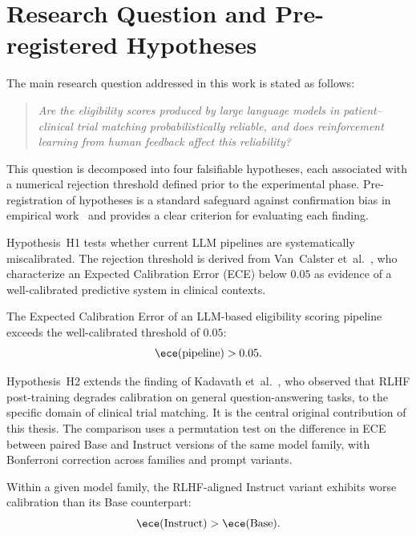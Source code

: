 \section{Research Question and Pre-registered Hypotheses}
\label{sec:met-hypotheses}

The main research question addressed in this work is stated as follows:

\begin{quote}
    \itshape
    Are the eligibility scores produced by large language models in 
    patient--clinical trial matching probabilistically reliable, and does 
    reinforcement learning from human feedback affect this reliability?
\end{quote}

This question is decomposed into four falsifiable hypotheses, each associated 
with a numerical rejection threshold defined prior to the experimental phase. 
Pre-registration of hypotheses is a standard safeguard against confirmation 
bias in empirical work~\cite{collins2024tripod} and provides a clear criterion 
for evaluating each finding.

Hypothesis~H1 tests whether current LLM pipelines are systematically 
miscalibrated. The rejection threshold is derived from Van~Calster 
et~al.~\cite{vancalster2019calibration}, who characterize an Expected 
Calibration Error (ECE) below $0.05$ as evidence of a well-calibrated 
predictive system in clinical contexts.

\begin{hypothesis}
    The Expected Calibration Error of an LLM-based eligibility scoring 
    pipeline exceeds the well-calibrated threshold of $0.05$:
    \[
        \ece(\text{pipeline}) > 0.05.
    \]
\end{hypothesis}

Hypothesis~H2 extends the finding of Kadavath et~al.~\cite{kadavath2022know}, 
who observed that RLHF post-training degrades calibration on general 
question-answering tasks, to the specific domain of clinical trial matching. 
It is the central original contribution of this thesis. The comparison uses 
a permutation test on the difference in ECE between paired Base and Instruct 
versions of the same model family, with Bonferroni correction across families 
and prompt variants.

\begin{hypothesis}
    Within a given model family, the RLHF-aligned Instruct variant exhibits 
    worse calibration than its Base counterpart:
    \[
        \ece(\text{Instruct}) > \ece(\text{Base}).
    \]
\end{hypothesis}

